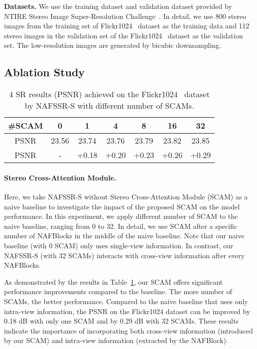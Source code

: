 \documentclass[10pt,twocolumn,letterpaper]{article}
\begin{document}
\textbf{Datasets.}
We use the training dataset and validation dataset provided by NTIRE Stereo Image Super-Resolution Challenge~\cite{Wang2022NTIRE}.
In detail, we use 800 stereo images from the training set of Flickr1024~\cite{wang2019flickr1024} dataset as the training data and 112 stereo images in the validation set of the Flickr1024~\cite{wang2019flickr1024} dataset as the validation set. The low-resolution images are generated by bicubic downsampling.

\subsection{Ablation Study}

\begin{table}[]
\centering
\setlength{\tabcolsep}{4.5pt}
\caption{4 SR results (PSNR) achieved on the Flickr1024~\cite{wang2019flickr1024} dataset by NAFSSR-S with different number of SCAMs.}
\vspace{-3mm}
\label{tab:scam}
\begin{tabular}{ccccccc}
\toprule
\#SCAM     & 0     & 1     & 4     & 8     & 16    & 32    \\
\midrule
PSNR         & 23.56 & 23.74 & 23.76 & 23.79 & 23.82 & 23.85 \\
PSNR & -     & +0.18 & +0.20 & +0.23 & +0.26 & +0.29 \\
\bottomrule
\end{tabular}
\vspace{-2mm}
\end{table}

\paragraph{Stereo Cross-Attention Module.} Here, we take NAFSSR-S without Stereo Cross-Attention Module (SCAM) as a naive baseline to investigate the impact of the proposed SCAM on the model performance. In this experiment, we apply different number of SCAM to the naive baseline, ranging from 0 to 32. In detail, we use SCAM after a specific number of NAFBlocks in the middle of the naive baseline. 
Note that our naive baseline (with 0 SCAM) only uses single-view information. In contrast, our NAFSSR-S (with 32 SCAMs) interacts with cross-view information after every NAFBlocks.

As demonstrated by the results in Table~\ref{tab:scam}, our SCAM offers significant performance improvements compared to the baseline.
The more number of SCAMs, the better performance. Compared to the naive baseline that uses only intra-view information, the PSNR on the Flickr1024 dataset can be improved by 0.18 dB with only one SCAM and by 0.29 dB with 32 SCAMs. 
These results indicate the importance of incorporating both cross-view information (introduced by our SCAM) and intra-view information (extracted by the NAFBlock).
\end{document}
